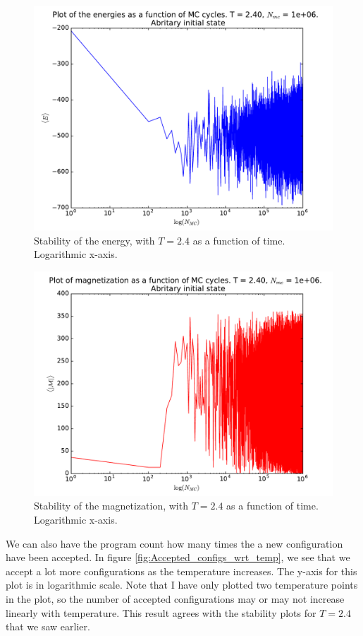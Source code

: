 \documentclass[12pt]{article}
\begin{document}
\begin{figure}[H]
\centering
\includegraphics[width=\linewidth]{Plots/Energy_stability_logarithmic_T24.pdf}
\caption{Stability of the energy, with $T = 2.4$ as a function of time. Logarithmic x-axis.}
\label{fig:Energy_stab_log_T2}
\end{figure}
\begin{figure}[H]
\centering
\includegraphics[width=\linewidth]{Plots/Magnetization_stability_logarithmic_T24.pdf}
\caption{Stability of the magnetization, with $T = 2.4$ as a function of time. Logarithmic x-axis.}
\label{fig:Mag_stab_log_T2}
\end{figure}


We can also have the program count how many times the a new configuration have been accepted. In figure \ref{fig:Accepted_configs_wrt_temp}, we see that we accept a lot more configurations as the temperature increases. The y-axis for this plot is in logarithmic scale. Note that I have only plotted two temperature points in the plot, so the number of accepted configurations may or may not increase linearly with temperature. This result agrees with the stability plots for $T=2.4$ that we saw earlier. 
\end{document}
